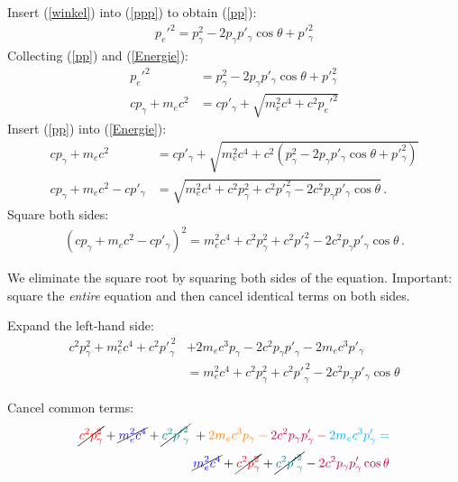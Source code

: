 Insert (\ref{winkel}) into (\ref{ppp}) to obtain (\ref{pp}):
\begin{align}
	p_e'^2 = p_\gamma^2 - 2 p_\gamma p'_\gamma \cos\theta + p'^2_{\gamma}\label{pp}
\end{align}
Collecting (\ref{pp}) and (\ref{Energie}):
\begin{align*}
	p_e'^2 &= p_\gamma^2 - 2 p_\gamma p'_\gamma \cos\theta + p'^2_{\gamma}\\
	c p_\gamma + m_e c^2 &= c p'_\gamma + \sqrt{m_e^2 c^4 + c^2 p_e'^2}
\end{align*}
Insert (\ref{pp}) into (\ref{Energie}):
\begin{align*}
	c p_\gamma + m_e c^2 &= c p'_\gamma + \sqrt{m_e^2 c^4 + c^2\!\left(p_\gamma^2 - 2 p_\gamma p'_\gamma \cos\theta + p'^2_{\gamma}\right)}\\
	c p_\gamma + m_e c^2 - c p'_\gamma &= \sqrt{m_e^2 c^4 + c^2 p_\gamma^2 + c^2 p'^2_\gamma - 2 c^2 p_\gamma p'_\gamma \cos\theta}\,.
\end{align*}
Square both sides:
\begin{align*}
	\left(c p_\gamma + m_e c^2 - c p'_\gamma\right)^2
	= m_e^2 c^4 + c^2 p_\gamma^2 + c^2 p'^2_\gamma - 2 c^2 p_\gamma p'_\gamma \cos\theta\,.
\end{align*}

\begin{DidacticBox}
	We eliminate the square root by squaring both sides of the equation.
	Important: square the \emph{entire} equation and then cancel identical terms
	on both sides.
\end{DidacticBox}

Expand the left-hand side:
\begin{align*}
	c^2 p_\gamma^2 + m_e^2 c^4 + c^2 {p'}_\gamma^{\,2}&
	+ 2 m_e c^3 p_\gamma - 2 c^2 p_\gamma {p'}_\gamma - 2 m_e c^3 p'_\gamma\\
	&= m_e^2 c^4 + c^2 p_\gamma^2 + c^2 {p'}_\gamma^{\,2} - 2 c^2 p_\gamma p'_\gamma \cos\theta
\end{align*}

Cancel common terms:
\[
\begin{aligned}
	\cancel{\color{red}c^2 p_\gamma^2}
	+ \cancel{\color{blue}m_e^2 c^4}
	+ \cancel{\color{teal}c^2 {p'}_\gamma^2}
	\;&
	+ \color{orange}2 m_e c^3 p_\gamma
	- \color{purple}2 c^2 p_\gamma p'_\gamma
	- \color{cyan}2 m_e c^3 p'_\gamma
	=\\[0.2em]
	\;&\cancel{\color{blue}m_e^2 c^4}
	+ \cancel{\color{red}c^2 p_\gamma^2}
	+ \cancel{\color{teal}c^2 {p'}_\gamma^2}
	- \color{purple}2 c^2 p_\gamma p'_\gamma \cos\theta
\end{aligned}
\]

